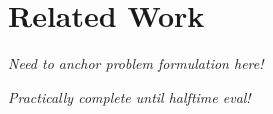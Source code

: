 \chapter{Related Work}\label{cha:relwork}

\textit{Need to anchor problem formulation here!}

\textit{Practically complete until halftime eval!}

